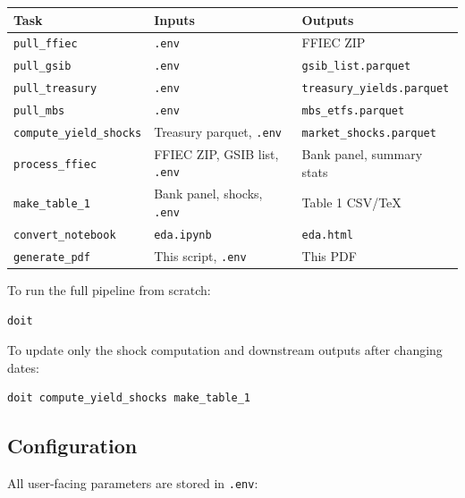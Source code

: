 \documentclass[12pt, a4paper]{article}
\begin{document}
\begin{center}
\begin{tabular}{lll}
\toprule
Task & Inputs & Outputs \\
\midrule
\texttt{pull\_ffiec}          & \texttt{.env}                          & FFIEC ZIP \\
\texttt{pull\_gsib}           & \texttt{.env}                          & \texttt{gsib\_list.parquet} \\
\texttt{pull\_treasury}       & \texttt{.env}                          & \texttt{treasury\_yields.parquet} \\
\texttt{pull\_mbs}            & \texttt{.env}                          & \texttt{mbs\_etfs.parquet} \\
\texttt{compute\_yield\_shocks} & Treasury parquet, \texttt{.env}      & \texttt{market\_shocks.parquet} \\
\texttt{process\_ffiec}       & FFIEC ZIP, GSIB list, \texttt{.env}    & Bank panel, summary stats \\
\texttt{make\_table\_1}       & Bank panel, shocks, \texttt{.env}      & Table 1 CSV/\TeX{} \\
\texttt{convert\_notebook}    & \texttt{eda.ipynb}                     & \texttt{eda.html} \\
\texttt{generate\_pdf}        & This script, \texttt{.env}             & This PDF \\
\bottomrule
\end{tabular}
\end{center}

To run the full pipeline from scratch:
\begin{lstlisting}
doit
\end{lstlisting}

To update only the shock computation and downstream outputs after changing dates:
\begin{lstlisting}
doit compute_yield_shocks make_table_1
\end{lstlisting}

\subsection{Configuration}

All user-facing parameters are stored in \texttt{.env}:
\end{document}
